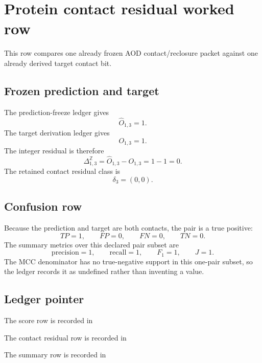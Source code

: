 \section{Protein contact residual worked row}

This row compares one already frozen AOD contact/reclosure packet against one already derived target contact bit.

\subsection{Frozen prediction and target}

The prediction-freeze ledger gives
\[
\widehat O_{1,3}=1.
\]
The target derivation ledger gives
\[
O_{1,3}=1.
\]
The integer residual is therefore
\[
\Delta^{\mathbb Z}_{1,3}
=\widehat O_{1,3}-O_{1,3}
=1-1=0.
\]
The retained contact residual class is
\[
\delta_3=(0,0).
\]

\subsection{Confusion row}

Because the prediction and target are both contacts, the pair is a true positive:
\[
TP=1,
\qquad
FP=0,
\qquad
FN=0,
\qquad
TN=0.
\]
The summary metrics over this declared pair subset are
\[
\mathrm{precision}=1,
\qquad
\mathrm{recall}=1,
\qquad
F_1=1,
\qquad
J=1.
\]
The MCC denominator has no true-negative support in this one-pair subset, so the ledger records it as undefined rather than inventing a value.

\subsection{Ledger pointer}

The score row is recorded in
\begin{center}
\small{}
\end{center}
The contact residual row is recorded in
\begin{center}
\small{}
\end{center}
The summary row is recorded in
\begin{center}
\small{}
\end{center}
